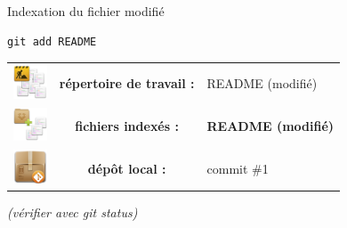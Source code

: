 \documentclass{beamer}
\begin{document}
\begin{frame}[fragile]{Indexation du fichier modifié}
	\begin{lstlisting}[frame=single]
		git add README
	\end{lstlisting}
	
	\begin{center}
		\begin{tabular}{l c l}
		\includegraphics[width=1cm]{img/working_dir} & \textbf{répertoire de travail :} & README (modifié)\\
		\includegraphics[width=1cm]{img/stash} & \textbf{fichiers indexés :} & \textbf{README (modifié)}\\
		\includegraphics[width=1cm]{img/git_repo} & \textbf{dépôt local :} & commit \#1 \\ 
		\end{tabular} 
	\end{center}

	\begin{center}
		\textit{(vérifier avec git status)}
	\end{center}
\end{frame}
\end{document}
